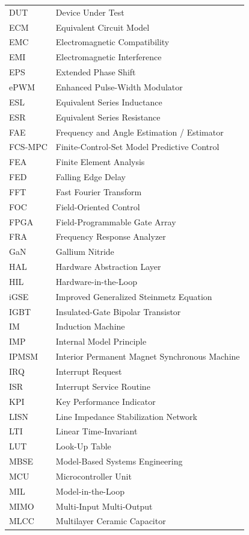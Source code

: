 \begin{longtable}{@{}p{3.5cm}p{10.5cm}@{}}
DUT & Device Under Test \\
ECM & Equivalent Circuit Model \\
EMC & Electromagnetic Compatibility \\
EMI & Electromagnetic Interference \\
EPS & Extended Phase Shift \\
ePWM & Enhanced Pulse-Width Modulator \\
ESL & Equivalent Series Inductance \\
ESR & Equivalent Series Resistance \\
FAE & Frequency and Angle Estimation / Estimator \\
FCS-MPC & Finite-Control-Set Model Predictive Control \\
FEA & Finite Element Analysis \\
FED & Falling Edge Delay \\
FFT & Fast Fourier Transform \\
FOC & Field-Oriented Control \\
FPGA & Field-Programmable Gate Array \\
FRA & Frequency Response Analyzer \\
GaN & Gallium Nitride \\
HAL & Hardware Abstraction Layer \\
HIL & Hardware-in-the-Loop \\
iGSE & Improved Generalized Steinmetz Equation \\
IGBT & Insulated-Gate Bipolar Transistor \\
IM & Induction Machine \\
IMP & Internal Model Principle \\
IPMSM & Interior Permanent Magnet Synchronous Machine \\
IRQ & Interrupt Request \\
ISR & Interrupt Service Routine \\
KPI & Key Performance Indicator \\
LISN & Line Impedance Stabilization Network \\
LTI & Linear Time-Invariant \\
LUT & Look-Up Table \\
MBSE & Model-Based Systems Engineering \\
MCU & Microcontroller Unit \\
MIL & Model-in-the-Loop \\
MIMO & Multi-Input Multi-Output \\
MLCC & Multilayer Ceramic Capacitor \\

\end{longtable}
